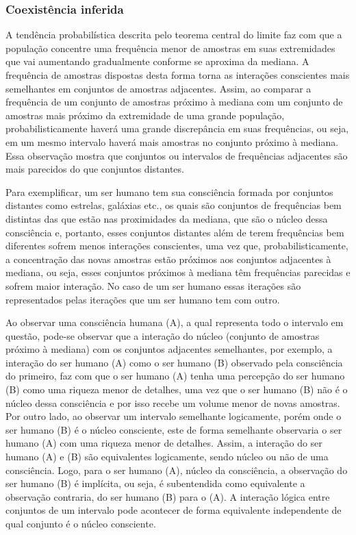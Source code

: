 \subsubsection{Coexistência inferida}
A tendência probabilística descrita pelo teorema central do limite faz com que a população concentre uma frequência menor de amostras em suas extremidades que vai aumentando gradualmente conforme se aproxima da mediana. A frequência de amostras dispostas desta forma torna as interações conscientes mais semelhantes em conjuntos de amostras adjacentes. Assim, ao comparar a frequência de um conjunto de amostras próximo à mediana com um conjunto de amostras mais próximo da extremidade de uma grande população, probabilisticamente haverá uma grande discrepância em suas frequências, ou seja, em um mesmo intervalo haverá mais amostras no conjunto próximo à mediana. Essa observação mostra que conjuntos ou intervalos de frequências adjacentes são mais parecidos do que conjuntos distantes. 

Para exemplificar, um ser humano tem sua consciência formada por conjuntos distantes como estrelas, galáxias etc., os quais são conjuntos de frequências bem distintas das que estão nas proximidades da mediana, que são o núcleo dessa consciência e, portanto, esses conjuntos distantes além de terem frequências bem diferentes sofrem menos interações conscientes, uma vez que, probabilisticamente, a concentração das novas amostras estão próximos aos conjuntos adjacentes à mediana, ou seja, esses conjuntos próximos à mediana têm frequências parecidas e sofrem maior interação. No caso de um ser humano essas iterações são representados pelas iterações que um ser humano tem com outro.  

Ao observar uma consciência humana (A), a qual representa todo o intervalo em questão, pode-se observar que a interação do núcleo (conjunto de amostras próximo à mediana) com os conjuntos adjacentes semelhantes, por exemplo, a interação do ser humano (A) como o ser humano (B) observado pela consciência do primeiro, faz com que o ser humano (A) tenha uma percepção do ser humano (B) como uma riqueza menor de detalhes, uma vez que o ser humano (B) não é o núcleo dessa consciência e por isso recebe um volume menor de novas amostras. Por outro lado, ao observar um intervalo semelhante logicamente, porém onde o ser humano (B) é o núcleo consciente, este de forma semelhante observaria o ser humano (A) com uma riqueza menor de detalhes. Assim, a interação do ser humano (A) e (B) são equivalentes logicamente, sendo núcleo ou não de uma consciência. Logo, para o ser humano (A), núcleo da consciência, a observação do ser humano (B) é implícita, ou seja, é subentendida como equivalente a observação contraria, do ser humano (B) para o (A). A interação lógica entre conjuntos de um intervalo pode acontecer de forma equivalente independente de qual conjunto é o núcleo consciente. 

